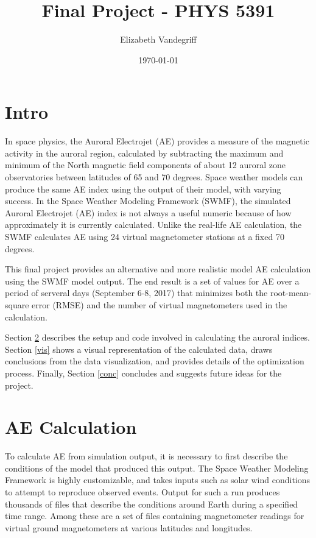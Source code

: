 \documentclass[12pt, letterpaper]{article}
\begin{document}
\title{Final Project - PHYS 5391}
\author{Elizabeth Vandegriff}
\date{\today}

\maketitle
\newpage
\tableofcontents
\newpage

\section{Intro} \label{intro}

In space physics, the Auroral Electrojet (AE) provides a measure of the magnetic activity in the auroral region, calculated by subtracting the maximum and minimum of the North magnetic field components of about 12 auroral zone observatories between latitudes of 65 and 70 degrees. Space weather models can produce the same AE index using the output of their model, with varying success. In the Space Weather Modeling Framework (SWMF), the simulated Auroral Electrojet (AE) index is not always a useful numeric because of how approximately it is currently calculated. Unlike the real-life AE calculation, the SWMF calculates AE using 24 virtual magnetometer stations at a fixed 70 degrees.

This final project provides an alternative and more realistic model AE calculation using the SWMF model output. The end result is a set of values for AE over a period of serveral days (September 6-8, 2017) that minimizes both the root-mean-square error (RMSE) and the number of virtual magnetometers used in the calculation.

Section \ref{calc} describes the setup and code involved in calculating the auroral indices. Section \ref{vis} shows a visual representation of the calculated data, draws conclusions from the data visualization, and provides details of the optimization process. Finally, Section \ref{conc} concludes and suggests future ideas for the project.


\section{AE Calculation} \label{calc}

To calculate AE from simulation output, it is necessary to first describe the conditions of the model that produced this output. The Space Weather Modeling Framework is highly customizable, and takes inputs such as solar wind conditions to attempt to reproduce observed events. Output for such a run produces thousands of files that describe the conditions around Earth during a specified time range. Among these are a set of files containing magnetometer readings for virtual ground magnetometers at various latitudes and longitudes.
\end{document}
